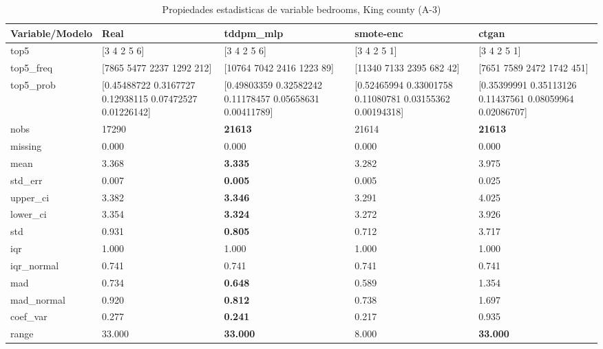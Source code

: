 \begin{table}[H]
\centering
\fontsize{8}{14}\selectfont
\caption{Propiedades  estadisticas de variable bedrooms, King county (A-3)}
\label{table-stats-king county-a-3-bedrooms}
\begin{tabular}{|l|m{10em}|m{10em}|m{10em}|m{10em}|}
\hline
 \rowcolor[gray]{0.8}
Variable/Modelo & Real & tddpm\_mlp & smote-enc & ctgan \\
\hline top5 & [3 4 2 5 6] & [3 4 2 5 6] & [3 4 2 5 1] & [3 4 2 5 1] \\
\hline top5\_freq & [7865 5477 2237 1292  212] & [10764  7042  2416  1223    89] & [11340  7133  2395   682    42] & [7651 7589 2472 1742  451] \\
\hline top5\_prob & [0.45488722 0.3167727  0.12938115 0.07472527 0.01226142] & [0.49803359 0.32582242 0.11178457 0.05658631 0.00411789] & [0.52465994 0.33001758 0.11080781 0.03155362 0.00194318] & [0.35399991 0.35113126 0.11437561 0.08059964 0.02086707] \\
\hline nobs & 17290 & \bfseries 21613 & \cellcolor[rgb]{0.9, 0.54, 0.52} 21614 & \bfseries 21613 \\
\hline missing & 0.000 & 0.000 & 0.000 & 0.000 \\
\hline mean & 3.368 & \bfseries 3.335 & 3.282 & \cellcolor[rgb]{0.9, 0.54, 0.52} 3.975 \\
\hline std\_err & 0.007 & \bfseries 0.005 & 0.005 & \cellcolor[rgb]{0.9, 0.54, 0.52} 0.025 \\
\hline upper\_ci & 3.382 & \bfseries 3.346 & 3.291 & \cellcolor[rgb]{0.9, 0.54, 0.52} 4.025 \\
\hline lower\_ci & 3.354 & \bfseries 3.324 & 3.272 & \cellcolor[rgb]{0.9, 0.54, 0.52} 3.926 \\
\hline std & 0.931 & \bfseries 0.805 & 0.712 & \cellcolor[rgb]{0.9, 0.54, 0.52} 3.717 \\
\hline iqr & 1.000 & 1.000 & 1.000 & 1.000 \\
\hline iqr\_normal & 0.741 & 0.741 & 0.741 & 0.741 \\
\hline mad & 0.734 & \bfseries 0.648 & 0.589 & \cellcolor[rgb]{0.9, 0.54, 0.52} 1.354 \\
\hline mad\_normal & 0.920 & \bfseries 0.812 & 0.738 & \cellcolor[rgb]{0.9, 0.54, 0.52} 1.697 \\
\hline coef\_var & 0.277 & \bfseries 0.241 & 0.217 & \cellcolor[rgb]{0.9, 0.54, 0.52} 0.935 \\
\hline range & 33.000 & \bfseries 33.000 & \cellcolor[rgb]{0.9, 0.54, 0.52} 8.000 & \bfseries 33.000 \\

\end{tabular}
\end{table}
